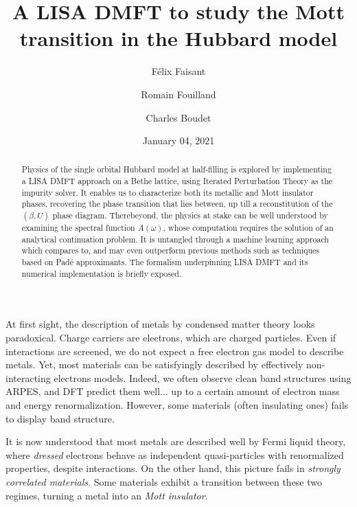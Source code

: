 \documentclass[reprint,amsmath,amssymb,aps,pra]{revtex4-2}
\begin{document}
\title{A LISA DMFT to study the Mott transition in the Hubbard model}

\author{Félix Faisant}
\author{Romain Fouilland}
\author{Charles Boudet}

\date{January 04, 2021}

\begin{abstract}
Physics of the single orbital Hubbard model at half-filling is explored by implementing a LISA DMFT approach on a Bethe lattice, using Iterated Perturbation Theory as the impurity solver. It enables us to characterize both its metallic and Mott insulator phases, recovering the phase transition that lies between, up till a reconstitution of the $(\beta, U)$ phase diagram. Therebeyond, the physics at stake can be well understood by examining the spectral function $A(\omega)$, whose computation requires the solution of an analytical continuation problem. It is untangled through a machine learning approach which compares to, and may even outperform previous methods such as techniques based on Padé approximants. The formalism underpinning LISA DMFT and its numerical implementation is briefly exposed.
\end{abstract}

\maketitle


At first sight, the description of metals by condensed matter theory looks paradoxical. Charge carriers are electrons, which are charged particles. Even if interactions are screened, we do not expect a free electron gas model to describe metals. Yet, most materials can be satisfyingly described by effectively non-interacting electrons models. Indeed, we often observe clean band structures using ARPES, and DFT predict them well... up to a certain amount of electron mass and energy renormalization. However, some materials (often insulating ones) fails to display band structure.

It is now understood that most metals are described well by Fermi liquid theory, where \emph{dressed} electrons behave as independent quasi-particles with renormalized properties, despite interactions. On the other hand, this picture fails in \emph{strongly correlated materials}. Some materials exhibit a transition between these two regimes, turning a metal into an \emph{Mott insulator}.
\end{document}
